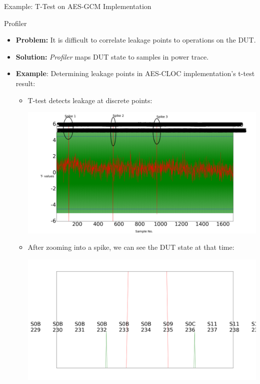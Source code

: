 \documentclass[xcolor=pdftex,dvipsnames,table,final]{beamer}
\begin{document}
\begin{frame}[fragile]{}
\begin{columns}[t]
\begin{column}{.31\linewidth}
\begin{block}{Example: T-Test on AES-GCM Implementation}
\begin{minipage}{0.45\linewidth}
        \end{minipage}
        
         
      \end{block}

      \begin{block}{Profiler}
         \begin{itemize}
           \item \textbf{Problem:} It is difficult to correlate leakage points to operations on the DUT.
           \item \textbf{Solution:} \emph{Profiler} maps DUT state to samples in power trace.
           \item \textbf{Example}: Determining leakage points in AES-CLOC implementation's t-test result:
         \begin{itemize}
         \item T-test detects leakage at discrete points:
          \begin{center}
          \includegraphics[scale=0.254]{../figures/profiler_1.png}
          \end{center}
          \item After zooming into a spike, we can see the DUT state at that time:
     \begin{center}
          \includegraphics[scale=0.254]{../figures/profiler_2.png}

\end{center}
\end{itemize}
\end{itemize}
\end{block}
\end{column}
\end{columns}
\end{frame}
\end{document}
